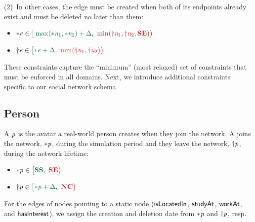 (2)~In other cases, the edge must be created when both of its endpoints already exist and must be deleted no later than them:

\begin{itemize}
    \item $ \varc{e} \in \interval
        {\max(\varcn{1}, \varcn{2}) + \Delta}
        {\min(\vardn{1}, \vardn{2}, \xSE)} $
    \item $ \vard{e} \in \interval
        {\varc{e} + \Delta}
        {\min(\vardn{1}, \vardn{2})} $
\end{itemize}

These constraints capture the ``minimum'' (\ie most relaxed) set of constraints that must be enforced in all domains.
Next, we introduce additional constraints specific to our social network schema.

\subsection{Person}

A \tPerson $\mathit{p}$ is the avatar a real-world person creates when they join the network. A \tPerson joins the network, ${\ast}\mathit{\mathit{p}}$, during the simulation period and they leave the network, ${\dagger}\mathit{\mathit{p}}$, during the network lifetime:

\begin{itemize}
    \item $\varc{\ePerson} \in \interval{\xSS}{\xSE}$
    \item $\vard{\ePerson} \in \interval{\varc{\ePerson} + \Delta}{\xNC}$
\end{itemize}

For the edges of \tPerson nodes pointing to a static node
($\textsf{isLocatedIn}$,
$\textsf{studyAt}$,
$\textsf{workAt}$, and
$\textsf{hasInterest}$), 
we assign the creation and deletion date from ${\ast}\mathit{\mathit{p}}$ and ${\dagger}\mathit{\mathit{p}}$, resp.

